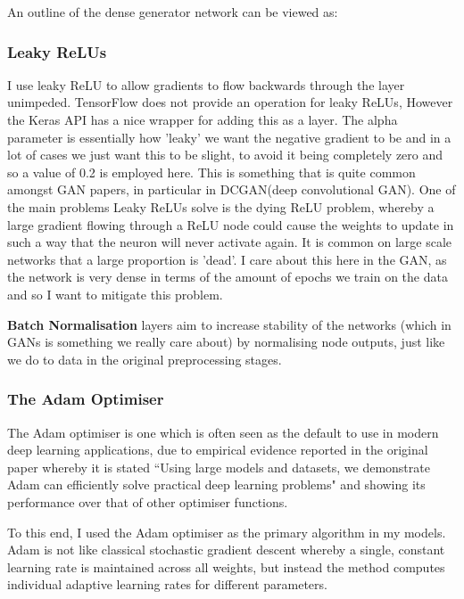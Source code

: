 \documentclass[12pt,a4paper,twoside]{report}
\begin{document}
An outline of the dense generator network can be viewed as:



\subsubsection{Leaky ReLUs}
I use leaky ReLU to allow gradients to flow backwards through the layer unimpeded. TensorFlow does not provide an operation for leaky ReLUs, However the Keras API has a nice wrapper for adding this as a layer. The alpha parameter is essentially how 'leaky' we want the negative gradient to be and in a lot of cases we just want this to be slight, to avoid it being completely zero and so a value of 0.2 is employed here. This is something that is quite common amongst GAN papers, in particular in DCGAN(deep convolutional GAN)\cite{DBLP:journals/corr/RadfordMC15}. One of the main problems Leaky ReLUs solve is the dying ReLU problem, whereby a large gradient flowing through a ReLU node could cause the weights to update in such a way that the neuron will never activate again. It is common on large scale networks that a large proportion is 'dead'. I care about this here in the GAN, as the network is very dense in terms of the amount of epochs we train on the data and so I want to mitigate this problem. 

\textbf{Batch Normalisation} layers aim to increase stability of the networks (which in GANs is something we really care about) by normalising node outputs, just like we do to data in the original preprocessing stages.

\subsubsection{The Adam Optimiser}
The Adam optimiser is one which is often seen as the default to use in modern deep learning applications, due to empirical evidence reported in the original paper\cite{DBLP:journals/corr/KingmaB14} whereby it is stated ``Using large models and datasets, we demonstrate Adam can efficiently solve practical deep learning problems" and showing its performance over that of other optimiser functions. 

To this end, I used the Adam optimiser as the primary algorithm in my models. Adam is not like classical stochastic gradient descent whereby a single, constant learning rate is maintained across all weights, but instead the method computes individual adaptive learning rates for different parameters.
\end{document}
